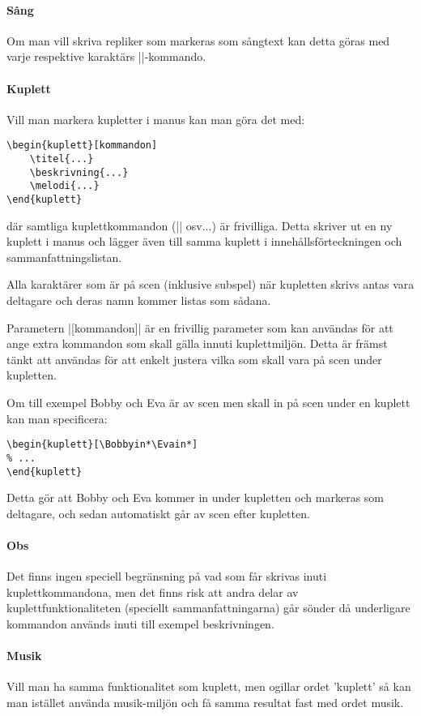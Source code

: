 \documentclass[a4paper,12pt]{article}
\begin{document}
\paragraph{Sång}
Om man vill skriva repliker som markeras som sångtext kan detta göras med varje respektive karaktärs |\Namnsj|-kommando.

\paragraph{Kuplett}
Vill man markera kupletter i manus kan man göra det med:
\begin{lstlisting}
\begin{kuplett}[kommandon]
	\titel{...}
	\beskrivning{...}
	\melodi{...}
\end{kuplett}
\end{lstlisting}
där samtliga kuplettkommandon (|\titel| osv...) är frivilliga. Detta skriver ut en ny kuplett i manus och lägger även till samma kuplett i innehållsförteckningen och sammanfattningslistan.

Alla karaktärer som är på scen (inklusive subspel) när kupletten skrivs antas vara deltagare och deras namn kommer listas som sådana.

Parametern |[kommandon]| är en frivillig parameter som kan användas för att ange extra kommandon som skall gälla innuti kuplettmiljön. Detta är främst tänkt att användas för att enkelt justera vilka som skall vara på scen under kupletten.

Om till exempel Bobby och Eva är av scen men skall in på scen under en kuplett kan man specificera:
\begin{lstlisting}
\begin{kuplett}[\Bobbyin*\Evain*]
% ...
\end{kuplett}
\end{lstlisting}
Detta gör att Bobby och Eva kommer in under kupletten och markeras som deltagare, och sedan automatiskt går av scen efter kupletten.

\paragraph{Obs} Det finns ingen speciell begränsning på vad som får skrivas inuti kuplett\-kommandona, men det finns risk att andra delar av kuplettfunktionaliteten (speciellt sammanfattningarna) går sönder då underligare kommandon används inuti till exempel beskrivningen.

\paragraph{Musik}
Vill man ha samma funktionalitet som kuplett, men ogillar ordet 'kuplett' så kan man istället använda musik-miljön och få samma resultat fast med ordet musik.
\end{document}
